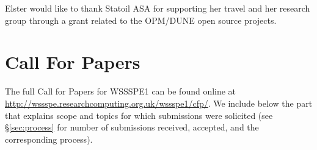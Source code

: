 \documentclass[11pt, oneside]{amsart}
\begin{document}
Elster would like to thank Statoil ASA for supporting her travel
and her research group through a grant related to the OPM/DUNE open source projects.






\newpage



\newpage

\appendix

\section{Call For Papers} \label{sec:cfp}

The full Call for Papers for WSSSPE1 can be found online at
\url{http://wssspe.researchcomputing.org.uk/wssspe1/cfp/}. We include
below the part that explains scope and topics for which submissions
were solicited (see \S\ref{sec:process} for number of submissions
received, accepted, and the corresponding process).
\end{document}
